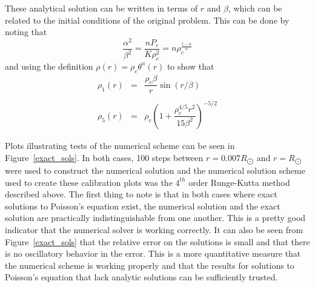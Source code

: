 \documentclass[11pt,letterpaper]{article}
\begin{document}
These analytical solution can be written in terms of $r$ and $\beta$, which can
be related to the initial conditions of the original problem. This can be done
by noting that
\begin{equation}
    \frac{\alpha^2}{\beta^2} =
    \frac{n P_c}{K \rho_c^2} =
    n \rho_c^{\frac{1-n}{n}}
\end{equation}
and using the definition $\rho\left(r\right) = \rho_c \theta^n\left(r\right)$ to 
show that
\begin{equation}
    \begin{array}{rcl}
        \rho_1\left(r\right) & = &
            \dfrac{\rho_c \beta}{r} \sin\left(r/\beta\right) \\ 
        \ \\
        \rho_5\left(r\right) & = &
            \rho_c\left(1 + \dfrac{\rho_c^{4/5}r^2}{15\beta^2}\right)^{-5/2}
    \end{array}
    \label{rho5}
\end{equation}

Plots illustrating tests of the numerical scheme can be seen in
Figure~\ref{exact_sols}. In both cases, 100 steps between $r = 0.007
R_{\bigodot}$ and $r = R_{\bigodot}$ were used to construct the numerical
solution and the numerical solution scheme used to create these calibration
plots was the $4^{th}$ order Runge-Kutta method described above. The first thing
to note is that in both cases where exact solutions to Poisson's equation exist,
the numerical solution and the exact solution are practically indistinguishable
from one another. This is a pretty good indicator that the numerical solver is
working correctly. It can also be seen from Figure~\ref{exact_sols} that the
relative error on the solutions is small and that there is no oscillatory
behavior in the error. This is a more quantitative measure that the numerical
scheme is working properly and that the results for solutions to Poisson's
equation that lack analytic solutions can be sufficiently trusted.
\end{document}
